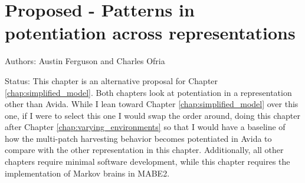 \chapter{Proposed - Patterns in potentiation across representations}
\label{chap:varying_representations}

\noindent
Authors: Austin Ferguson and Charles Ofria

\noindent
Status: This chapter is an alternative proposal for Chapter \ref{chap:simplified_model}. 
Both chapters look at potentiation in a representation other than Avida. 
While I lean toward Chapter \ref{chap:simplified_model} over this one, if I were to select this one I would swap the order around, doing this chapter after Chapter \ref{chap:varying_environments} so that I would have a baseline of how the multi-patch harvesting behavior becomes potentiated in Avida to compare with the other representation in this chapter. 
Additionally, all other chapters require minimal software development, while this chapter requires the implementation of Markov brains in MABE2. 



